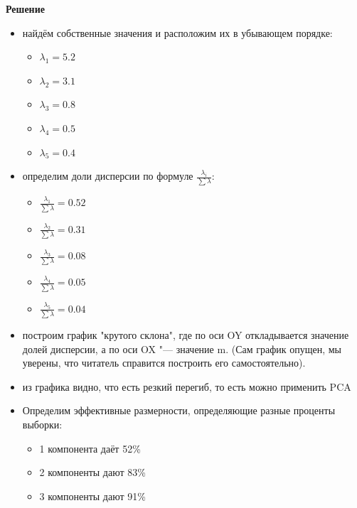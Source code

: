 \begin{enumerate}
     \textbf{Решение} \par
     \begin{itemize}
        \item найдём собственные значения и расположим их в убывающем порядке:\par
            \begin{itemize}
            \item $\lambda_{1}  = 5.2$
            \item $\lambda_{2}  = 3.1$
            \item $\lambda_{3}  = 0.8$
            \item $\lambda_{4}  = 0.5$
            \item $\lambda_{5}  = 0.4$
            \end{itemize}
        \item определим доли дисперсии по формуле $\frac{ \lambda_i }{\sum \lambda}$: \par
                \begin{itemize}
                \item $\frac{ \lambda_1 }{\sum \lambda}  = 0.52$
                \item $\frac{ \lambda_2 }{\sum \lambda}  = 0.31$
                \item $\frac{ \lambda_3 }{\sum \lambda}  = 0.08$
                \item $\frac{ \lambda_4 }{\sum \lambda}  = 0.05$
                \item $\frac{ \lambda_5 }{\sum \lambda}  = 0.04$
            \end{itemize} \par
        \item построим график "крутого склона", где по оси OY откладывается значение долей дисперсии, а по оси OX "--- значение m. (Сам график опущен, мы уверены, что читатель справится построить его самостоятельно). \par
        \item из графика видно, что есть резкий перегиб, то есть можно применить PCA
        \item Определим эффективные размерности, определяющие разные проценты выборки: \par
        \begin{itemize}
            \item 1 компонента даёт 52\%
            \item 2 компоненты дают 83\%
            \item 3 компоненты дают 91\%

\end{itemize}
\end{itemize}
\end{enumerate}

